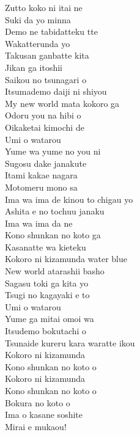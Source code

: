 \begin{multicols}{2}
Zutto koko ni itai ne\\
Suki da yo minna\\
Demo ne tabidatteku tte\\
Wakatterunda yo\\
Takusan ganbatte kita\\
Jikan ga itoshii\\
Saikou no tsunagari o\\
Itsumademo daiji ni shiyou\\

My new world mata kokoro ga\\
Odoru you na hibi o\\
Oikaketai kimochi de\\
Umi o watarou\\
Yume wa yume no you ni\\
Sugosu dake janakute\\
Itami kakae nagara\\
Motomeru mono sa\\

Ima wa ima de kinou to chigau yo\\
Ashita e no tochuu janaku\\
Ima wa ima da ne\\
Kono shunkan no koto ga\\
Kasanatte wa kieteku\\
Kokoro ni kizamunda water blue\\

New world atarashii basho\\
Sagasu toki ga kita yo\\
Tsugi no kagayaki e to\\
Umi o watarou\\
Yume ga mitai omoi wa\\
Itsudemo bokutachi o\\
Tsunaide kureru kara waratte ikou\\

Kokoro ni kizamunda\\
Kono shunkan no koto o\\
Kokoro ni kizamunda\\
Kono shunkan no koto o\\
Bokura no koto o\\
Ima o kasane soshite\\
Mirai e mukaou!
\end{multicols}

\ifdefined\COMPLETE
\else
	
\fi
